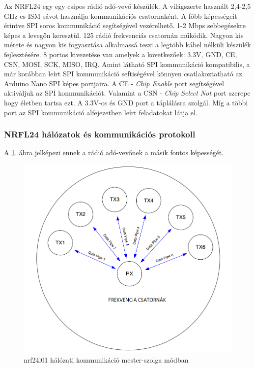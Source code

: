 \documentclass[a4paper,12pt]{article}
\begin{document}
Az NRFL24 egy egy csipes rádió adó-vevő készülék. \cite{nosem06}
A világszerte használt 2,4-2,5 GHz-es ISM sávot használja kommunikációs csatornaként.
A főbb képességeit érintve SPI soros kommunikáció segítségével vezérelhető.
1-2 Mbps sebbegésekre képes a levegőn keresztül.
125 rádió frekvenciás csatornán működik.
Nagyon kis mérete és nagyon kis fogyasztása alkalmassá teszi a legtöbb kábel nélküli készülék fejlesztésére.
8 portos kivezetése van amelyek a következőek: 3.3V, GND, CE, CSN, MOSI, SCK, MISO, IRQ.
Amint látható SPI kommunikáció kompatibilis, a már korábban leírt SPI kommunikáció seftiségével könnyen csatlakoztatható az Arduino Nano SPI képes portjaira.
A CE - \textit{Chip Enable} port segítségével aktiváljuk az SPI kommunikációt.
Valamint a CSN - \textit{Chip Select Not} port szerepe hogy életben tartsa ezt.
A 3.3V-os és GND port a táplálásra szolgál. Míg a többi port az SPI kommunikáció alfejezetben leírt feladatokat látja el.

\subsubsection{NRFL24 hálózatok és kommunikációs protokoll}\label{sec:nrlf24rfc}

A \ref{fig:nrf24l01_network}. ábra jelképezi ennek a rádió adó-vevőnek a másik fontos képességét.

\begin{figure}[htp]
	\centering
	\includegraphics[scale = 0.6]{images/nrf24l01_network.png}
	\caption[nrf24l01 network]{nrf24l01 hálózati kommunikáció mester-szolga módban}
	\label{fig:nrf24l01_network}
\end{figure}
\end{document}
